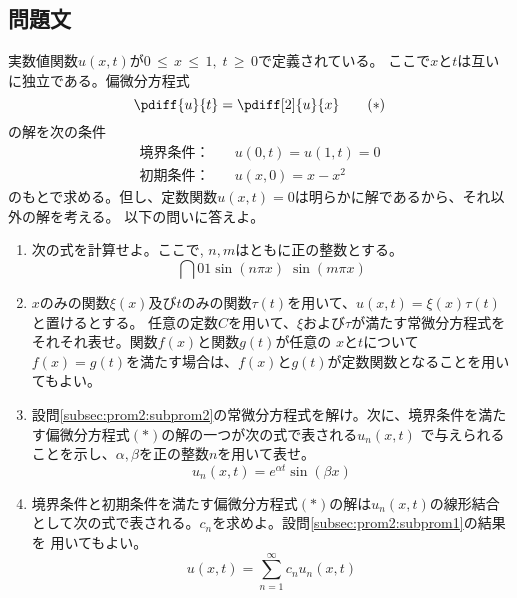 \documentclass[dvipdfmx,titlepage, 11pt, a4paper]{jsarticle}%
\begin{document}
\newpage
\section{}%
\subsection{問題文}
実数値関数$u(x, t)$が$0\, \leq \, x\, \leq\, 1, \; t\, \geq \, 0$で定義されている。
ここで$x$と$t$は互いに独立である。偏微分方程式
\begin{equation*}
    \pdiff{u}{t} = \pdiff[2]{u}{x} \qquad (*)
\end{equation*}
の解を次の条件
\begin{align*}
    \mbox{境界条件：} & \quad u(0, t) = u(1, t) = 0\\
    \mbox{初期条件：} & \quad u(x, 0) = x - x^{2}
\end{align*}
のもとで求める。但し、定数関数$u(x, t) = 0$は明らかに解であるから、それ以外の解を考える。
以下の問いに答えよ。
\begin{enumerate}[(1)]
    \item 次の式を計算せよ。ここで, $n, m$はともに正の整数とする。
        \begin{equation*}
            \dint{0}{1}{\sin (n\pi x)\; \sin (m\pi x)}
        \end{equation*}\label{subsec:prom2:subprom1}
    \item $x$のみの関数$\xi (x)$及び$t$のみの関数$\tau (t)$を用いて、$u(x, t) = \xi (x)\tau (t)$と置けるとする。
        任意の定数$C$を用いて、$\xi$および$\tau$が満たす常微分方程式をそれそれ表せ。関数$f(x)$と関数$g(t)$が任意の
        $x$と$t$について$f(x) = g(t)$を満たす場合は、$f(x)$と$g(t)$が定数関数となることを用いてもよい。\label{subsec:prom2:subprom2}
    \item 設問\eqref{subsec:prom2:subprom2}の常微分方程式を解け。次に、境界条件を満たす偏微分方程式$(*)$の解の一つが次の式で表される$u_n(x, t)$
        で与えられることを示し、$\alpha, \beta$を正の整数$n$を用いて表せ。
        \begin{equation*}
            u_n (x, t) = e^{\alpha t}\sin (\beta x)
        \end{equation*}\label{subsec:prom2:subprom3}
    \item 境界条件と初期条件を満たす偏微分方程式$(*)$の解は$u_n (x, t)$の線形結合として次の式で表される。$c_n$を求めよ。設問\eqref{subsec:prom2:subprom1}の結果を
        用いてもよい。
        \begin{equation*}
            u(x, t) = \sum\limits_{n = 1}^{\infty} c_n u_n (x, t)
        \end{equation*}\label{subsec:prom2:subprom4}
\end{enumerate}
\newpage
\end{document}
